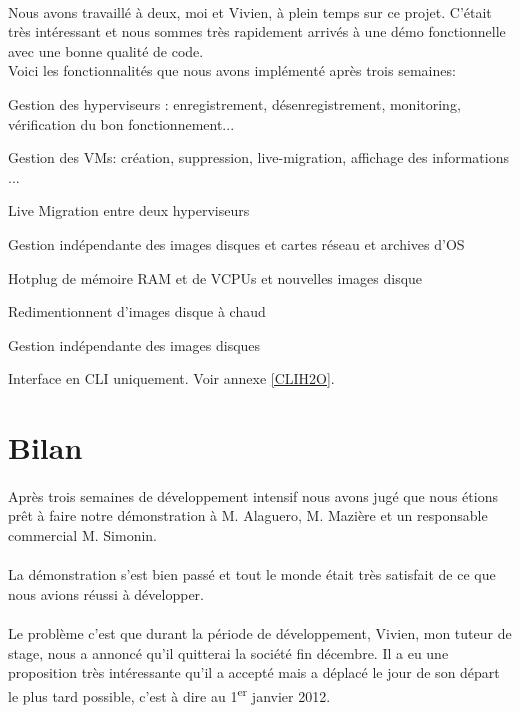 \paragraph*{}
Nous avons travaillé à deux, moi et Vivien, à plein temps sur ce projet. C'était très intéressant et nous sommes très rapidement arrivés à une démo fonctionnelle avec une bonne
qualité de code.
\\
Voici les fonctionnalités que nous avons implémenté après trois semaines:
\begin{listi}
	\item Gestion des hyperviseurs : enregistrement, désenregistrement, monitoring, vérification du bon fonctionnement...
	\item Gestion des VMs: création, suppression, live-migration, affichage des informations ...
	\item Live Migration entre deux hyperviseurs
	\item Gestion indépendante des images disques et cartes réseau et archives d'OS
	\item Hotplug de mémoire RAM et de VCPUs et nouvelles images disque
	\item Redimentionnent d'images disque à chaud
	\item Gestion indépendante des images disques
	\item Interface en CLI uniquement. Voir annexe \ref{CLIH2O}.
\end{listi}

\section{Bilan}

\paragraph*{}
Après trois semaines de développement intensif nous avons jugé que nous étions prêt à faire notre démonstration à M. Alaguero, M. Mazière et un responsable commercial
M. Simonin.

\paragraph*{}
La démonstration s'est bien passé et tout le monde était très satisfait de ce que nous avions réussi à développer.

\paragraph*{}
Le problème c'est que durant la période de développement, Vivien, mon tuteur de stage, nous a annoncé qu'il quitterai la société fin décembre. Il a eu une proposition très intéressante
qu'il a accepté mais a déplacé le jour de son départ le plus tard possible, c'est à dire au 1\textsuperscript{er} janvier 2012.

